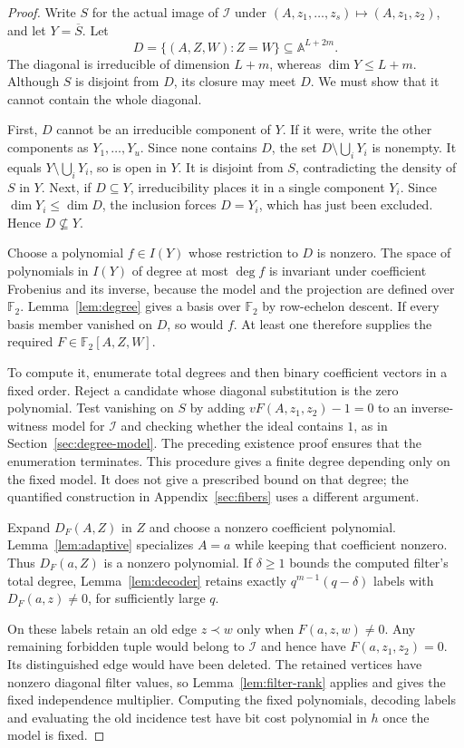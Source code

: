 \documentclass[11pt,a4paper]{article}
\newcommand{\F}{\mathbb F}
\newcommand{\A}{\mathbb A}
\newcommand{\Ical}{\mathcal I}
\theoremstyle{definition}
\theoremstyle{remark}
\numberwithin{equation}{section}
\begin{document}
\begin{proof}
Write $S$ for the actual image of $\Ical$ under $(A,z_1,\ldots,z_s)\mapsto(A,z_1,z_2)$, and let $Y=\overline S$. Let
\[
D=\{(A,Z,W):Z=W\}\subseteq\A^{L+2m}.
\]
The diagonal is irreducible of dimension $L+m$, whereas $\dim Y\le L+m$. Although $S$ is disjoint from $D$, its closure may meet $D$. We must show that it cannot contain the whole diagonal.

First, $D$ cannot be an irreducible component of $Y$. If it were, write the other components as $Y_1,\ldots,Y_u$. Since none contains $D$, the set $D\setminus\bigcup_iY_i$ is nonempty. It equals $Y\setminus\bigcup_iY_i$, so is open in $Y$. It is disjoint from $S$, contradicting the density of $S$ in $Y$. Next, if $D\subseteq Y$, irreducibility places it in a single component $Y_i$. Since $\dim Y_i\le\dim D$, the inclusion forces $D=Y_i$, which has just been excluded. Hence $D\nsubseteq Y$.

Choose a polynomial $f\in I(Y)$ whose restriction to $D$ is nonzero. The space of polynomials in $I(Y)$ of degree at most $\deg f$ is invariant under coefficient Frobenius and its inverse, because the model and the projection are defined over $\F_2$. Lemma~\ref{lem:degree} gives a basis over $\F_2$ by row-echelon descent. If every basis member vanished on $D$, so would $f$. At least one therefore supplies the required $F\in\F_2[A,Z,W]$.

To compute it, enumerate total degrees and then binary coefficient vectors in a fixed order. Reject a candidate whose diagonal substitution is the zero polynomial. Test vanishing on $S$ by adding $vF(A,z_1,z_2)-1=0$ to an inverse-witness model for $\Ical$ and checking whether the ideal contains $1$, as in Section~\ref{sec:degree-model}. The preceding existence proof ensures that the enumeration terminates. This procedure gives a finite degree depending only on the fixed model. It does not give a prescribed bound on that degree; the quantified construction in Appendix~\ref{sec:fibers} uses a different argument.

Expand $D_F(A,Z)$ in $Z$ and choose a nonzero coefficient polynomial. Lemma~\ref{lem:adaptive} specializes $A=a$ while keeping that coefficient nonzero. Thus $D_F(a,Z)$ is a nonzero polynomial. If $\delta\ge1$ bounds the computed filter's total degree, Lemma~\ref{lem:decoder} retains exactly $q^{m-1}(q-\delta)$ labels with $D_F(a,z)\ne0$, for sufficiently large $q$.

On these labels retain an old edge $z\prec w$ only when $F(a,z,w)\ne0$. Any remaining forbidden tuple would belong to $\Ical$ and hence have $F(a,z_1,z_2)=0$. Its distinguished edge would have been deleted. The retained vertices have nonzero diagonal filter values, so Lemma~\ref{lem:filter-rank} applies and gives the fixed independence multiplier. Computing the fixed polynomials, decoding labels and evaluating the old incidence test have bit cost polynomial in $h$ once the model is fixed.
\end{proof}
\end{document}
